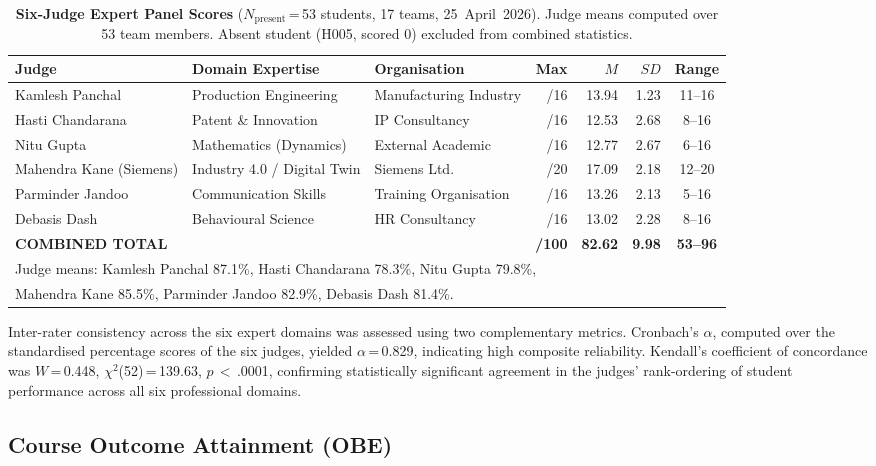 \documentclass[utf8]{FrontiersinHarvard}
\begin{document}
\begin{table}[h]
\caption{\textbf{Six-Judge Expert Panel Scores} ($N_{\text{present}}$\,=\,53
students, 17 teams, 25~April~2026). Judge means computed over 53 team
members. Absent student (H005, scored 0) excluded from combined statistics.}
\label{tab:rubric}
\begin{tabular}{lllrrrc}
\toprule
\textbf{Judge} & \textbf{Domain Expertise} & \textbf{Organisation} &
\textbf{Max} & $M$ & $SD$ & \textbf{Range} \\
\midrule
Kamlesh Panchal         & Production Engineering      & Manufacturing Industry & /16 & 13.94 & 1.23 & 11--16 \\
Hasti Chandarana        & Patent \& Innovation        & IP Consultancy         & /16 & 12.53 & 2.68 & 8--16  \\
Nitu Gupta              & Mathematics (Dynamics)      & External Academic      & /16 & 12.77 & 2.67 & 6--16  \\
Mahendra Kane (Siemens) & Industry 4.0 / Digital Twin & Siemens Ltd.           & /20 & 17.09 & 2.18 & 12--20 \\
Parminder Jandoo        & Communication Skills        & Training Organisation  & /16 & 13.26 & 2.13 & 5--16  \\
Debasis Dash            & Behavioural Science         & HR Consultancy         & /16 & 13.02 & 2.28 & 8--16  \\
\midrule
\textbf{COMBINED TOTAL} &                             &                        & \textbf{/100} &
\textbf{82.62} & \textbf{9.98} & \textbf{53--96} \\
\bottomrule
\multicolumn{7}{l}{\small Judge means: Kamlesh Panchal 87.1\%, Hasti Chandarana 78.3\%, Nitu Gupta 79.8\%,} \\
\multicolumn{7}{l}{\small Mahendra Kane 85.5\%, Parminder Jandoo 82.9\%, Debasis Dash 81.4\%.}
\end{tabular}
\end{table}

Inter-rater consistency across the six expert domains was assessed using
two complementary metrics. Cronbach's $\alpha$, computed over the
standardised percentage scores of the six judges, yielded
$\alpha$\,=\,0.829, indicating high composite reliability. Kendall's
coefficient of concordance was $W$\,=\,0.448,
$\chi^2$(52)\,=\,139.63, $p$\,$<$\,.0001, confirming statistically
significant agreement in the judges' rank-ordering of student performance
across all six professional domains.

\subsection{Course Outcome Attainment (OBE)}
\label{sec:coattainment}
\end{document}
